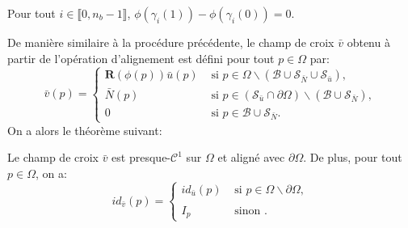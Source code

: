 \begin{lemma}
    Pour tout $i\in\llbracket0, n_b-1\rrbracket$, $\phi(\gamma_i(1))-\phi(\gamma_i(0))=0$.
\end{lemma}


De manière similaire à la procédure précédente, le champ de croix $\bar{v}$ obtenu à partir de l'opération d'alignement est défini pour tout $p\in\Omega$ par:
\begin{equation}
\bar{v}(p)=
\left\{
\begin{array}{ll}
\mathbf{R}(\phi(p))\bar{u}(p) & \mbox{ si } p\in\Omega\backslash(\mathcal{B}\cup\mathcal{S}_{\bar{N}}\cup\mathcal{S}_{\bar{u}}),\\[0.5cm]
\bar{N}(p) & \mbox{ si } p\in(\mathcal{S}_{\bar{u}}\cap\partial\Omega)\backslash(\mathcal{B}\cup\mathcal{S}_{\bar{N}}),\\[0.5cm]
0 & \mbox{ si } p\in\mathcal{B}\cup\mathcal{S}_{\bar{N}}.
\end{array}
\right.
\end{equation}
On a alors le théorème suivant:
\begin{theorem}
Le champ de croix $\bar{v}$ est presque-$\mathcal{C}^1$ sur $\Omega$ et aligné avec $\partial\Omega$. De plus, pour tout $p\in\Omega$, on a:
\begin{equation}
id_{\bar{v}}(p)=
\left\{
\begin{array}{ll}
    id_{\bar{u}}(p) & \mbox{ si } p\in\Omega\backslash\partial\Omega,\\\\
    I_p & \mbox{ sinon }.
\end{array}
\right.
\end{equation}
\end{theorem}


